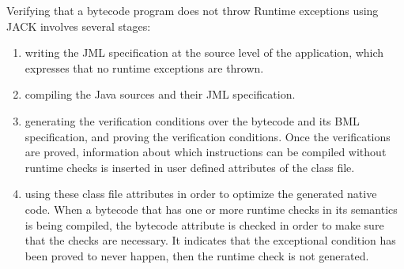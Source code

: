 Verifying that a bytecode program does not throw Runtime exceptions using JACK involves several stages:
\begin{enumerate}
\item writing the JML specification at the source level of the application, which expresses that no runtime exceptions are thrown.
\item compiling the Java sources and their JML specification.
\item generating the verification conditions over the bytecode and its BML specification, and proving the verification conditions. Once the verifications are proved, information about which instructions can be compiled without runtime checks is inserted in user defined attributes of the class file.
\item using these class file attributes in order to optimize the generated native code. When a bytecode that has one or more runtime checks in its semantics is being compiled, the bytecode attribute is checked in order to make sure that the checks are necessary. It indicates that the exceptional condition has been proved to never happen, then the runtime check is not generated.
\end{enumerate}

%
%


